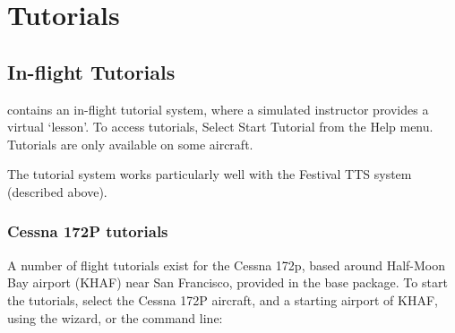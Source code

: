 
\chapter{Tutorials\label{tutorials}}

\section{In-flight Tutorials}

\FlightGear{} contains an in-flight tutorial system, where a simulated instructor provides a
virtual `lesson'. To access tutorials, Select Start Tutorial from the Help menu. Tutorials are
only available on some aircraft.

The tutorial system works particularly well with the Festival TTS system (described above).

\subsection{Cessna 172P tutorials}

A number of flight tutorials exist for the Cessna 172p, based around Half-Moon Bay airport
(KHAF) near San Francisco, provided in the base package. To start the tutorials, select the 
Cessna 172P aircraft, and a starting airport of KHAF, using the wizard, or the command line:

